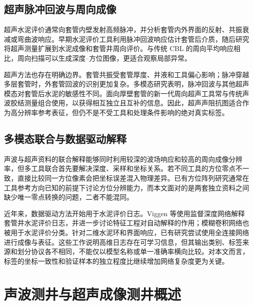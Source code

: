 \subsection{超声脉冲回波与周向成像}

超声水泥评价通常向套管内壁发射高频脉冲，并分析套管内外界面的反射、共振衰减或弯曲波响应。早期水泥评价工具利用脉冲回波响应估计套管后介质\cite{Froelich1982CementEvaluation}，随后研究将超声测量扩展到水泥成像和套管井周向评价\cite{Uswak1995CementImaging,VanKuijk2005UltrasonicImager}。与传统 CBL 的周向平均响应相比，周向扫描可以生成深度--方位图像，更适合观察局部异常。

超声方法也存在明确边界。套管共振受套管厚度、井液和工具偏心影响；脉冲穿越多层套管时，外套管回波的识别更加复杂\cite{Viggen2016PulseEcho}。多模态研究表明，脉冲回波与其他超声模态对套管后水泥的敏感性不同\cite{Froelich2008MultimodeCement}。面向厚壁套管的新一代周向超声工具常与传统声波胶结测量组合使用，以获得相互独立且互补的信息\cite{Acosta2017UltrasonicCement}。因此，超声声阻抗图适合作为高分辨率参考表征，但仍不是不受工具和处理条件影响的绝对真实标签。

\subsection{多模态联合与数据驱动解释}

声波与超声资料的联合解释能够同时利用较深的波场响应和较高的周向成像分辨率，但多工具联合首先要解决深度、采样和坐标关系。若不同工具的方位零点不一致，直接比较同一方位像素会把坐标误差混入物理差异。已有方位阵列研究通常在工具参考方向已知的前提下讨论方位分辨能力\cite{Che2014PhasedArcReception,Zuo2020AzimuthCement}，而本文面对的是两套独立资料之间缺少唯一零点转换的问题，二者不能混同。

近年来，数据驱动方法开始用于水泥评价日志。Viggen 等使用监督深度网络解释套管井水泥评价日志\cite{Viggen2020AutomaticCement}，并进一步讨论特征工程对自动解释的作用\cite{Viggen2021FeatureEngineering}；模糊卷积网络也被用于水泥评价分类\cite{Nezhad2023FuzzyCement}。针对二维水泥环和界面响应，已有研究尝试使用全连接网络进行成像与表征\cite{Zhang2023CementFCNN}。这些工作说明高维日志存在可学习信息，但其输出类别、标签来源和划分协议各不相同，不能仅以模型名称或单一准确率横向比较。对本文而言，标签的坐标一致性和验证样本的独立程度比继续增加网络复杂度更为关键。

\section{声波测井与超声成像测井概述}


